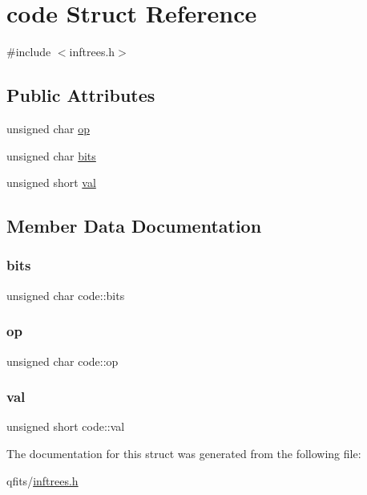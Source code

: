 \hypertarget{structcode}{}\section{code Struct Reference}
\label{structcode}


{\ttfamily \#include $<$inftrees.\+h$>$}

\subsection*{Public Attributes}
\begin{DoxyCompactItemize}
\item 
unsigned char \hyperlink{structcode_a4f075d73a9177d05cc7d332105295b83}{op}
\item 
unsigned char \hyperlink{structcode_a5defcebb356dca1a5a8d39995f28d66b}{bits}
\item 
unsigned short \hyperlink{structcode_a6f9c73627997e8fc6df02e620cf9a6f5}{val}
\end{DoxyCompactItemize}


\subsection{Member Data Documentation}
\mbox{\label{structcode_a5defcebb356dca1a5a8d39995f28d66b}} 
\subsubsection{\texorpdfstring{bits}{bits}}
{\footnotesize\ttfamily unsigned char code\+::bits}

\mbox{\label{structcode_a4f075d73a9177d05cc7d332105295b83}} 
\subsubsection{\texorpdfstring{op}{op}}
{\footnotesize\ttfamily unsigned char code\+::op}

\mbox{\label{structcode_a6f9c73627997e8fc6df02e620cf9a6f5}} 
\subsubsection{\texorpdfstring{val}{val}}
{\footnotesize\ttfamily unsigned short code\+::val}



The documentation for this struct was generated from the following file\+:\begin{DoxyCompactItemize}
\item 
qfits/\hyperlink{inftrees_8h}{inftrees.\+h}\end{DoxyCompactItemize}
